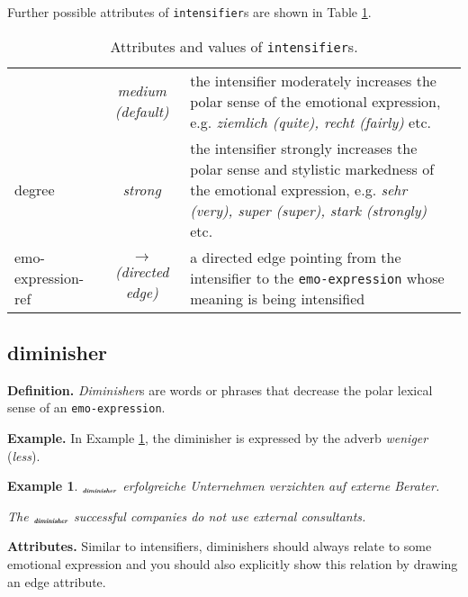 \documentclass[11pt,a4paper]{article}
\newlength{\clmnwidth}
\theoremstyle{mytheoremstyle}
\newtheorem{exmp}{Example}[section]
\newcommand{\mtag}[2]{{\upshape[\emph{#2}\upshape]$_{\textrm{\bfseries\emph{\tiny
        #1}}}$}}
\newcommand{\diminisher}[2][]{\mtag{di\-mi\-ni\-sher\ifstrempty{#1}{}{:#1}}{#2}}
\begin{document}
Further possible attributes of \texttt{intensifier}s are shown in
Table \ref{tbl:intensifier}.
\begin{center}
  \begin{table}[htb]
    \caption{Attributes and values of \texttt{intensifier}s.}
    \begin{tabular}{|l|c|p{0.875\clmnwidth}|}\hline

      & \textit{medium (default)} & the intensifier moderately
      increases the polar sense of the emotional expression,
      e.g. \textit{ziemlich (quite), recht (fairly)} etc.\\\cline{2-3}

      \multirow{-2}{*}{degree} & \textit{strong} & the intensifier
      strongly increases the polar sense and stylistic markedness of the
      emotional expression, e.g. \textit{sehr (very), super (super),
        stark (strongly)} etc.\\\hline


      emo-expression-ref & \textit{$\longrightarrow$\newline(directed
        edge)} & a directed edge pointing from the intensifier to the
      \texttt{emo-expression} whose meaning is being intensified\\\hline
    \end{tabular}
    \label{tbl:intensifier}
  \end{table}
\end{center}

\subsection{diminisher}
\noindent\textbf{Definition.} \emph{Diminisher}s are words or phrases
that decrease the polar lexical sense of an \texttt{emo-expression}.

\noindent\textbf{Example.} In Example \ref{exmp:diminisher}, the
diminisher is expressed by the adverb \textit{weniger}
(\textit{less}).
\begin{exmp}
  \diminisher{Weniger} erfolgreiche Unternehmen verzichten auf externe
  Berater.\label{exmp:diminisher}

  The \diminisher{less} successful companies do not use external
  consultants.
\end{exmp}
\noindent\textbf{Attributes.} Similar to intensifiers, diminishers
should always relate to some emotional expression and you should also
explicitly show this relation by drawing an edge attribute.
\end{document}
